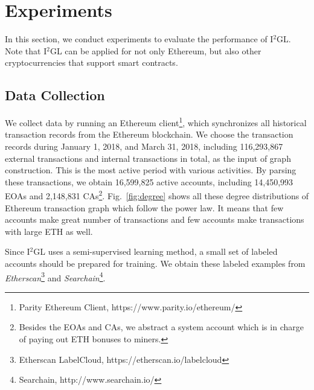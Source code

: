 
\section{Experiments}
\label{sec:experiments}
In this section, we conduct experiments to evaluate the performance of I$^2$GL. Note that I$^2$GL can be applied for not only Ethereum, but also other cryptocurrencies that support smart contracts.

\subsection{Data Collection}
We collect data by running an Ethereum client\footnote{Parity Ethereum Client, https://www.parity.io/ethereum/}, which synchronizes all historical transaction records from the Ethereum blockchain. We choose the transaction records during January 1, 2018, and March 31, 2018, including 116,293,867 external transactions and internal transactions in total, as the input of graph construction. This is the most active period with various activities. By parsing these transactions, we obtain 16,599,825 active accounts, including 14,450,993 EOAs and 2,148,831 CAs\footnote{Besides the EOAs and CAs, we abstract a system account which is in charge of paying out ETH bonuses to miners.}. Fig.~\ref{fig:degree} shows all these degree distributions of Ethereum transaction graph which follow the power law. It means that few accounts make great number of transactions and few accounts make transactions with large ETH as well.

Since I$^2$GL uses a semi-supervised learning method, a small set of labeled accounts should be prepared for training. We obtain these labeled examples from \emph{Etherscan}\footnote{Etherscan LabelCloud, https://etherscan.io/labelcloud} and \emph{Searchain}\footnote{Searchain, http://www.searchain.io/}.


